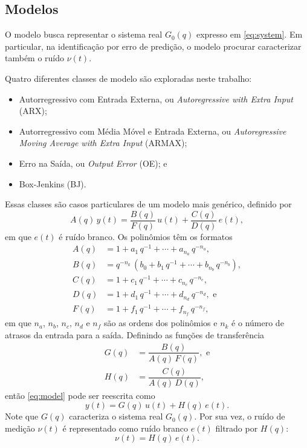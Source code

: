 \documentclass{ppgeesa}
\newcommand{\Prod}{\,}
\begin{document}
\subsection{Modelos}

O modelo busca representar o sistema real $G_0(q)$ expresso em \eqref{eq:system}.
Em particular, na identificação por erro de predição, o modelo procurar caracterizar também o ruído $\nu(t)$.

Quatro diferentes classes de modelo são exploradas neste trabalho:
\begin{itemize}
  \item Autorregressivo com Entrada Externa, ou \emph{Autoregressive with Extra Input} (ARX);
  \item Autorregressivo com Média Móvel e Entrada Externa, ou \emph{Autoregressive Moving Average with Extra Input} (ARMAX);
  \item Erro na Saída, ou \emph{Output Error} (OE); e
  \item Box-Jenkins (BJ).
\end{itemize}
Essas classes são casos particulares de um modelo mais genérico, definido por
\begin{equation}\label{eq:model}
  A(q) \Prod y(t) = \dfrac{B(q)}{F(q)} \Prod u(t) + \dfrac{C(q)}{D(q)} \Prod e(t)
  ,
\end{equation}
em que $e(t)$ é ruído branco.
Os polinômios têm os formatos
\begin{align}
  A(q) &= 1 + a_1 \Prod q^{-1} + \dotsb + a_{n_a} \Prod q^{-n_a}
  ,
  \\
  B(q) &= q^{-n_k} \Prod \left(b_0 + b_1 \Prod q^{-1} + \dotsb + b_{n_b} \Prod q^{-n_b}\right)
  ,
  \\
  C(q) &= 1 + c_1 \Prod q^{-1} + \dotsb + c_{n_c} \Prod q^{-n_c}
  ,
  \\
  D(q) &= 1 + d_1 \Prod q^{-1} + \dotsb + d_{n_d} \Prod q^{-n_d}
  , \text{ e}
  \\
  F(q) &= 1 + f_1 \Prod q^{-1} + \dotsb + f_{n_f} \Prod q^{-n_f}
  ,
\end{align}
em que $n_a$, $n_b$, $n_c$, $n_d$ e $n_f$ são as ordens dos polinômios e $n_k$ é o número de atrasos da entrada para a saída.
Definindo as funções de transferência
\begin{align}
  G(q) &= \dfrac{B(q)}{A(q) \Prod F(q)}
  , \text{ e}
  \\
  H(q) &= \dfrac{C(q)}{A(q) \Prod D(q)}
  ,
\end{align}
então \eqref{eq:model} pode ser reescrita como
\begin{equation}\label{eq:model-tf}
  y(t) = G(q) \Prod u(t) + H(q) \Prod e(t)
  .
\end{equation}
Note que $G(q)$ caracteriza o sistema real $G_0(q)$.
Por sua vez, o ruído de medição $\nu(t)$ é representado como ruído branco $e(t)$ filtrado por $H(q)$: %
\begin{equation}
  \nu(t) = H(q) \Prod e(t)
  .
\end{equation}
\end{document}
